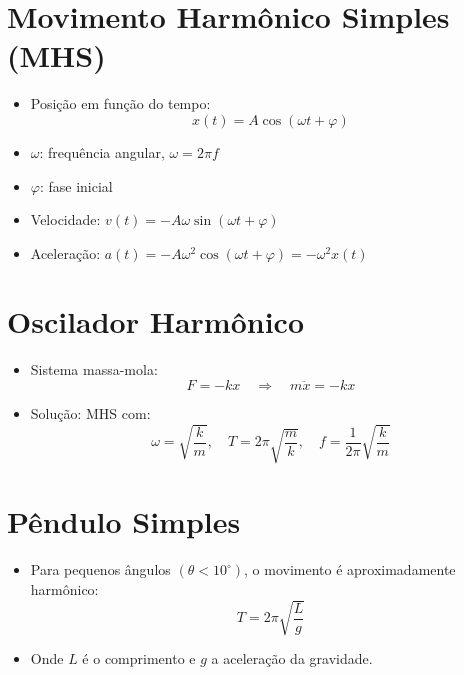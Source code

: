 \documentclass[a4paper,12pt]{article}
\begin{document}
\begin{multicols}{2}
\section{Movimento Harmônico Simples (MHS)}

\begin{itemize}
    \item Posição em função do tempo:
    \[
        x(t) = A \cos(\omega t + \varphi)
    \]
    \item $\omega$: frequência angular, $\omega = 2\pi f$
    \item $\varphi$: fase inicial
    \item Velocidade: $v(t) = -A\omega \sin(\omega t + \varphi)$
    \item Aceleração: $a(t) = -A\omega^2 \cos(\omega t + \varphi) = -\omega^2 x(t)$
\end{itemize}

\section{Oscilador Harmônico}
\begin{itemize}
    \item Sistema massa-mola:
    \[
        F = -kx \quad \Rightarrow \quad m\ddot{x} = -kx
    \]
    \item Solução: MHS com:
    \[
        \omega = \sqrt{\frac{k}{m}}, \quad T = 2\pi\sqrt{\frac{m}{k}}, \quad f = \frac{1}{2\pi}\sqrt{\frac{k}{m}}
    \]
\end{itemize}

\section{Pêndulo Simples}
\begin{itemize}
    \item Para pequenos ângulos $(\theta < 10^\circ)$, o movimento é aproximadamente harmônico:
    \[
        T = 2\pi \sqrt{\frac{L}{g}}
    \]
    \item Onde $L$ é o comprimento e $g$ a aceleração da gravidade.
\end{itemize}


\end{multicols}
\end{document}
